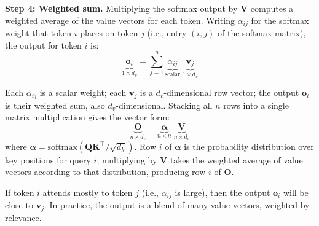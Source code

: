 \textbf{Step 4: Weighted sum.}\hspace{1em} Multiplying the softmax output by $\mathbf{V}$ computes a weighted average of the value vectors for each token. Writing $\alpha_{ij}$ for the softmax weight that token $i$ places on token $j$ (i.e., entry $(i, j)$ of the softmax matrix), the output for token $i$ is:
\begin{equation}
\underbrace{\mathbf{o}_i}_{1 \times d_v} = \sum_{j=1}^{n} \underbrace{\alpha_{ij}}_{\text{scalar}} \;\underbrace{\mathbf{v}_j}_{1 \times d_v}
\end{equation}

Each $\alpha_{ij}$ is a scalar weight; each $\mathbf{v}_j$ is a $d_v$-dimensional row vector; the output $\mathbf{o}_i$ is their weighted sum, also $d_v$-dimensional. Stacking all $n$ rows into a single matrix multiplication gives the vector form:
\begin{equation}
\underbrace{\mathbf{O}}_{n \times d_v} = \underbrace{\boldsymbol{\alpha}}_{n \times n}\; \underbrace{\mathbf{V}}_{n \times d_v}
\end{equation}
where $\boldsymbol{\alpha} = \text{softmax}\!\left(\mathbf{Q}\mathbf{K}^\top / \sqrt{d_k}\right)$. Row $i$ of $\boldsymbol{\alpha}$ is the probability distribution over key positions for query $i$; multiplying by $\mathbf{V}$ takes the weighted average of value vectors according to that distribution, producing row $i$ of $\mathbf{O}$.

If token $i$ attends mostly to token $j$ (i.e., $\alpha_{ij}$ is large), then the output $\mathbf{o}_i$ will be close to $\mathbf{v}_j$. In practice, the output is a blend of many value vectors, weighted by relevance.


